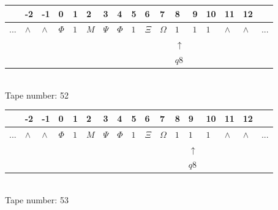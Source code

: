 \documentclass[11pt]{article}
\begin{document}
\begin{table}[H]
\centering
\begin{tabular}{lllllllllllllllll}
 & -2 & -1 & 0 & 1 & 2 & 3 & 4 & 5 & 6 & 7 & 8 & 9 & 10 & 11 & 12 & \\
\hline
$...$ & \multicolumn{1}{|l|}{$\wedge$} & \multicolumn{1}{|l|}{$\wedge$} & \multicolumn{1}{|l|}{$\Phi$} & \multicolumn{1}{|l|}{$1$} & \multicolumn{1}{|l|}{$M$} & \multicolumn{1}{|l|}{$\Psi$} & \multicolumn{1}{|l|}{$\Phi$} & \multicolumn{1}{|l|}{$1$} & \multicolumn{1}{|l|}{$\Xi$} & \multicolumn{1}{|l|}{$\Omega$} & \multicolumn{1}{|l|}{$1$} & \multicolumn{1}{|l|}{$1$} & \multicolumn{1}{|l|}{$1$} & \multicolumn{1}{|l|}{$\wedge$} & \multicolumn{1}{|l|}{$\wedge$} & $...$\\
\hline
&  &  &  &  &  &  &  &  &  &  & $\uparrow$ &  &  &  &  &  \\
&  &  &  &  &  &  &  &  &  &  & $ q8 $ &  &  &  &  &  \\
\end{tabular}
\\
Tape number: 52
\noindent\makebox[\linewidth]{\hdashrule{\textwidth}{1pt}{1pt}}\end{table}

\begin{table}[H]
\centering
\begin{tabular}{lllllllllllllllll}
 & -2 & -1 & 0 & 1 & 2 & 3 & 4 & 5 & 6 & 7 & 8 & 9 & 10 & 11 & 12 & \\
\hline
$...$ & \multicolumn{1}{|l|}{$\wedge$} & \multicolumn{1}{|l|}{$\wedge$} & \multicolumn{1}{|l|}{$\Phi$} & \multicolumn{1}{|l|}{$1$} & \multicolumn{1}{|l|}{$M$} & \multicolumn{1}{|l|}{$\Psi$} & \multicolumn{1}{|l|}{$\Phi$} & \multicolumn{1}{|l|}{$1$} & \multicolumn{1}{|l|}{$\Xi$} & \multicolumn{1}{|l|}{$\Omega$} & \multicolumn{1}{|l|}{$1$} & \multicolumn{1}{|l|}{$1$} & \multicolumn{1}{|l|}{$1$} & \multicolumn{1}{|l|}{$\wedge$} & \multicolumn{1}{|l|}{$\wedge$} & $...$\\
\hline
&  &  &  &  &  &  &  &  &  &  &  & $\uparrow$ &  &  &  &  \\
&  &  &  &  &  &  &  &  &  &  &  & $ q8 $ &  &  &  &  \\
\end{tabular}
\\
Tape number: 53
\noindent\makebox[\linewidth]{\hdashrule{\textwidth}{1pt}{1pt}}\end{table}
\clearpage
\end{document}
